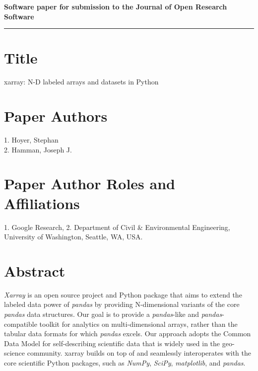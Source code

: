 \documentclass{jors}
\begin{document}
{\bf Software paper for submission to the Journal of Open Research Software} \\

%


\rule{\textwidth}{1pt}

\vspace{0.5cm}

\section*{Title}

xarray: N-D labeled arrays and datasets in Python

\section*{Paper Authors}

{1. Hoyer, Stephan \\
 2. Hamman, Joseph J.}

\section*{Paper Author Roles and Affiliations}
{1. Google Research, 2. Department of Civil \& Environmental Engineering, University of Washington, Seattle, WA, USA.}

\section*{Abstract}

\textit{Xarray} is an open source project and Python package that aims to extend the labeled data power of \textit{pandas} by providing N-dimensional variants of the core \textit{pandas} data structures.
Our goal is to provide a \textit{pandas}-like and \textit{pandas}-compatible toolkit for analytics on multi-dimensional arrays, rather than the tabular data formats for which \textit{pandas} excels.
Our approach adopts the Common Data Model for self-describing scientific data that is widely used in the geo-science community.
xarray builds on top of and seamlessly interoperates with the core scientific Python packages, such as \textit{NumPy}, \textit{SciPy}, \textit{matplotlib}, and \textit{pandas}.
\end{document}
